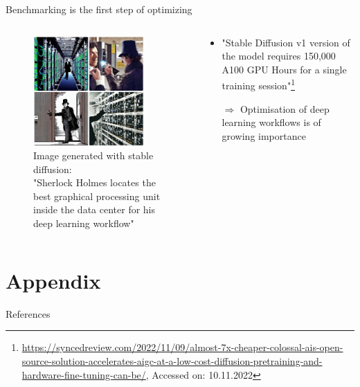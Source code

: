 \documentclass[compress,aspectratio=169]{beamer}
\begin{document}
\begin{frame}{Benchmarking is the first step of optimizing}
\label{pg:lastpage} %

\begin{columns}
        \begin{column}{0.5\textwidth}
            \centering
            \vspace{-1em}
            \begin{figure}
            \includegraphics[width=0.85\textwidth]{assets/Sherlock-Holmes-locates-the-best-graphical-processing-unit-inside-the-data-center-for-his-deep-learning-workflow}
            \caption*{Image generated with stable diffusion: \\
            \tiny{"Sherlock Holmes locates the best graphical processing unit inside the data center for his deep learning workflow"}}
            \end{figure}
        \end{column}
        \begin{column}{0.5\textwidth}
            \begin{itemize}
                \item "Stable Diffusion v1 version of the model requires 150,000 A100 GPU Hours for a single training session"\footnote{\tiny{\url{https://syncedreview.com/2022/11/09/almost-7x-cheaper-colossal-ais-open-source-solution-accelerates-aigc-at-a-low-cost-diffusion-pretraining-and-hardware-fine-tuning-can-be/}}, Accessed on: 10.11.2022}
                \vspace{1em}
                \item[$\Rightarrow$] Optimisation of deep learning workflows is of growing importance
            \end{itemize}
        \end{column}
    \end{columns}

\end{frame}

\section{Appendix}

\begin{frame}{References}
    \renewcommand*{\bibfont}{\normalfont\scriptsize}
    \printbibliography[heading=none]
\end{frame}
\end{document}
